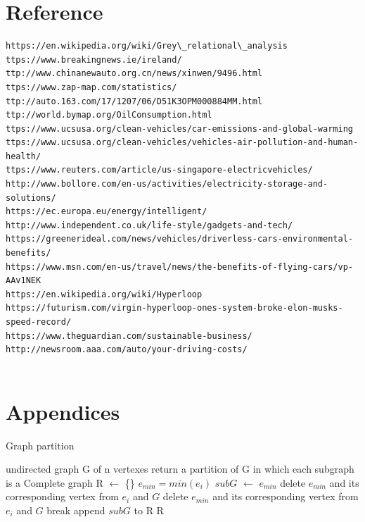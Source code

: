 \documentclass{mcmthesis}
\begin{document}
	\section{Reference}
	\begin{lstlisting}
https://en.wikipedia.org/wiki/Grey\_relational\_analysis
ttps://www.breakingnews.ie/ireland/
ttp://www.chinanewauto.org.cn/news/xinwen/9496.html
ttps://www.zap-map.com/statistics/
ttp://auto.163.com/17/1207/06/D51K3OPM000884MM.html
ttp://world.bymap.org/OilConsumption.html
ttps://www.ucsusa.org/clean-vehicles/car-emissions-and-global-warming
ttps://www.ucsusa.org/clean-vehicles/vehicles-air-pollution-and-human-health/
ttps://www.reuters.com/article/us-singapore-electricvehicles/
http://www.bollore.com/en-us/activities/electricity-storage-and-solutions/
https://ec.europa.eu/energy/intelligent/
http://www.independent.co.uk/life-style/gadgets-and-tech/
https://greenerideal.com/news/vehicles/driverless-cars-environmental-benefits/
https://www.msn.com/en-us/travel/news/the-benefits-of-flying-cars/vp-AAv1NEK
https://en.wikipedia.org/wiki/Hyperloop
https://futurism.com/virgin-hyperloop-ones-system-broke-elon-musks-speed-record/
https://www.theguardian.com/sustainable-business/
http://newsroom.aaa.com/auto/your-driving-costs/


	\end{lstlisting}
	
	\section{Appendices}
	\begin{algorithm}
		\caption{Graph partition}
		\begin{algorithmic}
			\REQUIRE  undirected graph G of n vertexes
			\ENSURE return a partition of G in which each subgraph is a Complete graph
			\ENDFOR
			\STATE R $\gets$ \{\}
			\STATE $e_{min} = min(e_i)$
			\STATE $subG$ $\gets$ {$e_{min}$}
			\STATE delete $e_{min}$ and its corresponding vertex from $e_i$ and $G$
			\STATE delete $e_{min}$ and its corresponding vertex from $e_i$ and $G$
			\ELSE
			\STATE break
			\ENDIF
			\ENDFOR
			\STATE append $subG$ to R
			\ENDWHILE
			\RETURN R 
		\end{algorithmic}
	\end{algorithm}
\end{document}
